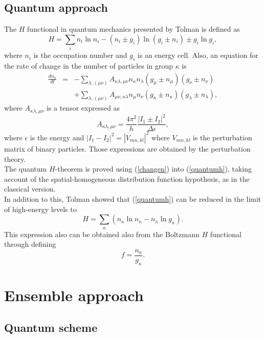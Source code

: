 \documentclass{article}
\begin{document}
\subsection{Quantum approach}
The $H$ functional in quantum mechanics presented by Tolman \cite{tolman} is defined as 
\begin{equation}
    H=\sum_i n_i \ln n_i -(n_i\pm g_i)\ln (g_i \pm n_i)\pm g_i\ln g_i, \label{quantumh}
\end{equation}
where $n_i$ is the occupation number and $g_i$ is an energy cell. Also, an equation for the rate of change in the number of particles in group $\kappa$ is
\begin{eqnarray}
    \frac{d n_{\kappa}}{dt}&=&-\sum_{\lambda,(\mu \nu)}A_{\kappa\lambda,\mu\nu} n_{\kappa}n_{\lambda}(g_{\mu}\pm n_{\mu})(g_{\nu}\pm n_{\nu})\nonumber \\
    &&+\sum_{\lambda,(\mu \nu)}A_{\mu\nu,\kappa\lambda} n_{\mu}n_{\nu}(g_{\kappa}\pm n_{\kappa})(g_{\lambda}\pm n_{\lambda}),\label{changen}
\end{eqnarray}
where $A_{\kappa\lambda,\mu\nu}$ is a tensor expressed as
\begin{equation}
  A_{\kappa\lambda,\mu\nu}=\frac{4\pi^{2}}{h}\frac{|I_1\pm I_2|^2}{\Delta \epsilon},
\end{equation}
where $\epsilon$ is the energy and $|I_1-I_2|^2=|V_{mn,kl}|^2$ where $V_{mn,kl}$ is the perturbation matrix of binary particles. Those expressions are obtained by the perturbation theory.\\
The quantum $H$-theorem is proved using (\ref{changen}) into (\ref{quantumh}), taking account of the spatial-homogeneous distribution function hypothesis, as in the classical version.\\
In addition to this, Tolman showed that (\ref{quantumh}) can be reduced in the limit of high-energy levels to
\begin{equation}
    H = \sum_{\kappa} (n_{\kappa} \ln n_{\kappa} - n_{\kappa} \ln g_{\kappa}). \label{reduce-h}
\end{equation}
This expression also can be obtained also from the Boltzmann $H$ functional through defining 
\begin{equation}
    f=\frac{n_{\kappa}}{ g_{\kappa}}.
\end{equation}
\section{Ensemble approach}
\subsection{Quantum scheme}
\end{document}
